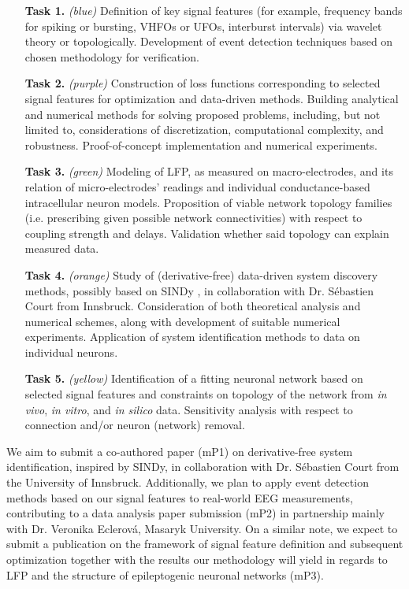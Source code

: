 \documentclass[a4paper,11pt]{scrartcl}
\begin{document}
\begin{itemize}
    \item[\textbf{Task 1.}] \textit{(blue)} Definition of key signal features (for example, frequency bands for spiking or bursting, \acp{VHFO} or \acp{UFO}, interburst intervals) via wavelet theory or topologically. Development of event detection techniques based on chosen methodology for verification.
    
    \item[\textbf{Task 2.}] \textit{(purple)} Construction of loss functions corresponding to selected signal features for optimization and data-driven methods. Building analytical and numerical methods for solving proposed problems, including, but not limited to, considerations of discretization, computational complexity, and robustness. Proof-of-concept implementation and numerical experiments.

    \item[\textbf{Task 3.}] \textit{(green)} Modeling of \ac{LFP}, as measured \cite{Brazdil2017} on macro-electrodes, and its relation of micro-electrodes' readings and individual conductance-based intracellular neuron models. Proposition of viable network topology families (i.e. prescribing given possible network connectivities) with respect to coupling strength and delays. Validation whether said topology can explain measured data.
    
    \item[\textbf{Task 4.}] \textit{(orange)} Study of (derivative-free) data-driven system discovery methods, possibly based on \ac{SINDy} \cite{Brunton2016}, in collaboration with Dr. Sébastien Court from Innsbruck. Consideration of both theoretical analysis and numerical schemes, along with development of suitable numerical experiments. Application of system identification methods to data on individual neurons.

    \item[\textbf{Task 5.}] \textit{(yellow)} Identification of a fitting neuronal network based on selected signal features and constraints on topology of the network from \textit{in vivo}, \textit{in vitro}, and \textit{in silico} data. Sensitivity analysis with respect to connection and/or neuron (network) removal.
\end{itemize}

We aim to submit a co-authored paper (mP1) on derivative-free system identification, inspired by SINDy, in collaboration with Dr. Sébastien Court from the University of Innsbruck. Additionally, we plan to apply event detection methods based on our signal features to real-world \ac{EEG} measurements, contributing to a data analysis paper submission (mP2) in partnership mainly with Dr. Veronika Eclerová, Masaryk University. On a similar note, we expect to submit a publication on the framework of signal feature definition and subsequent optimization together with the results our methodology will yield in regards to LFP and the structure of epileptogenic neuronal networks (mP3).
\end{document}
